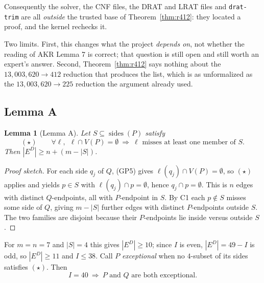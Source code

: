 \documentclass[11pt,a4paper]{article}
\theoremstyle{plain}
\newtheorem{lemma}[theorem]{Lemma}
\theoremstyle{definition}
\theoremstyle{remark}
\newcommand{\ED}{E^{D}}
\begin{document}
Consequently the solver, the CNF files, the DRAT and LRAT files and
\texttt{drat-trim} are all \emph{outside} the trusted base of
Theorem~\ref{thm:r412}: they located a proof, and the kernel rechecks it.

Two limits. First, this changes what the project \emph{depends on}, not whether
the reading of AKR Lemma 7 is correct; that question is still open and still
worth an expert's answer. Second, Theorem~\ref{thm:r412} says nothing about the
$13{,}003{,}620 \to 412$ reduction that produces the list, which is as
unformalized as the $13{,}003{,}620 \to 225$ reduction the argument already
used.


\subsection{Lemma A}

\begin{lemma}[Lemma A]\label{lem:A}
Let $S\subseteq\operatorname{sides}(P)$ satisfy
\[
  (\star)\qquad
  \forall \ell,\ \ \ell\cap V(P)=\emptyset
  \ \Longrightarrow\
  \ell \text{ misses at least one member of } S .
\]
Then $|\ED| \ge n + (m-|S|)$.
\end{lemma}

\begin{proof}[Proof sketch]
For each side $q_j$ of $Q$, (GP5) gives $\ell(q_j)\cap V(P)=\emptyset$, so
$(\star)$ applies and yields $p\in S$ with $\ell(q_j)\cap p=\emptyset$, hence
$q_j\cap p=\emptyset$. This is $n$ edges with distinct $Q$-endpoints, all with
$P$-endpoint in $S$. By \textsf{C1} each $p\notin S$ misses some side of $Q$,
giving $m-|S|$ further edges with distinct $P$-endpoints outside $S$. The two
families are disjoint because their $P$-endpoints lie inside versus outside $S$.
\end{proof}

For $m=n=7$ and $|S|=4$ this gives $|\ED|\ge10$; since $I$ is even, $|\ED|=49-I$
is odd, so $|\ED|\ge11$ and $I\le38$. Call $P$ \emph{exceptional} when no
$4$-subset of its sides satisfies $(\star)$. Then
\[
  I=40 \ \Longrightarrow\ P \text{ and } Q \text{ are both exceptional}.
\]
\end{document}
